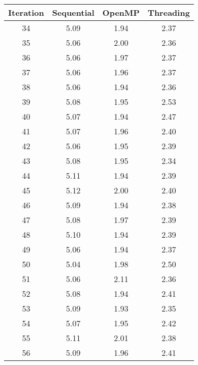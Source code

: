 \documentclass[a4paper]{article}
\begin{document}
        \begin{minipage}{\textwidth}
            \centering
            \begin{tabular}{ c c c c }
                Iteration & Sequential & OpenMP & Threading \\
                \hline
                \hline
                       34 &       5.09 &   1.94 &      2.37 \\
                       35 &       5.06 &   2.00 &      2.36 \\
                       36 &       5.06 &   1.97 &      2.37 \\
                       37 &       5.06 &   1.96 &      2.37 \\
                       38 &       5.06 &   1.94 &      2.36 \\
                       39 &       5.08 &   1.95 &      2.53 \\
                       40 &       5.07 &   1.94 &      2.47 \\
                       41 &       5.07 &   1.96 &      2.40 \\
                       42 &       5.06 &   1.95 &      2.39 \\
                       43 &       5.08 &   1.95 &      2.34 \\
                       44 &       5.11 &   1.94 &      2.39 \\
                       45 &       5.12 &   2.00 &      2.40 \\
                       46 &       5.09 &   1.94 &      2.38 \\
                       47 &       5.08 &   1.97 &      2.39 \\
                       48 &       5.10 &   1.94 &      2.39 \\
                       49 &       5.06 &   1.94 &      2.37 \\
                       50 &       5.04 &   1.98 &      2.50 \\
                       51 &       5.06 &   2.11 &      2.36 \\
                       52 &       5.08 &   1.94 &      2.41 \\
                       53 &       5.09 &   1.93 &      2.35 \\
                       54 &       5.07 &   1.95 &      2.42 \\
                       55 &       5.11 &   2.01 &      2.38 \\
                       56 &       5.09 &   1.96 &      2.41 \\

\end{tabular}
\end{minipage}
\end{document}
